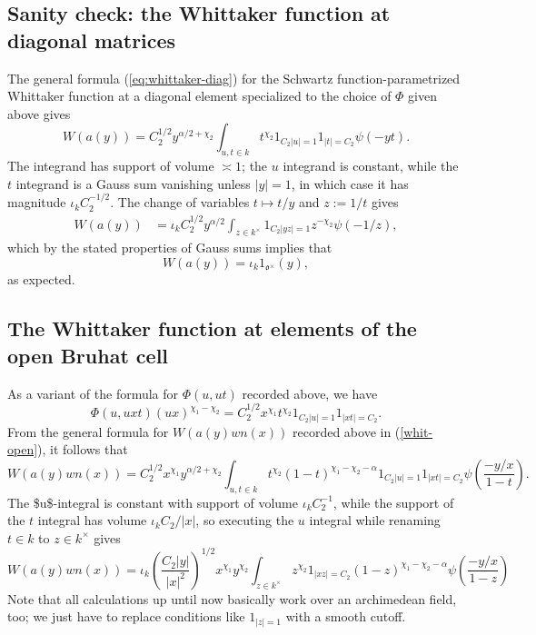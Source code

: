 \documentclass[reqno]{amsart} 
\begin{document}
\subsection{Sanity check: the Whittaker function at diagonal matrices}
\label{sec:org12b4732}
The general formula (\ref{eq:whittaker-diag}) for the Schwartz function-parametrized Whittaker function at a diagonal element specialized to the choice of \(\Phi\) given above gives
\begin{equation*}
  W(a(y)) = C_2^{1/2} y^{\alpha/2+\chi_2} \int_{u,t \in k} t^{\chi_2} 1_{C_2 |u| = 1} 1_{|t| = C_2} \psi(-y t).
\end{equation*}
The integrand has support of volume \(\asymp 1\); the \(u\) integrand is constant, while the \(t\) integrand is a Gauss sum vanishing unless \(|y| = 1\), in which case it has magnitude \(\iota_k C_2^{-1/2}\).  The change of variables \(t \mapsto t/y\) and \(z := 1/t\) gives
\begin{align*}
  W(a(y))
  &=
    \iota_k
    C_2^{1/2}
    y^{\alpha/2}
    \int_{z \in k^\times}
    1_{C_2 |y z| = 1}
    z^{-\chi_2} \psi(-1/z),
\end{align*}
which by the stated properties of Gauss sums implies that
\begin{equation*}
  W(a(y)) = \iota_{k} 1_{\mathfrak{o}^\times}(y),
\end{equation*}
as expected.

\subsection{The Whittaker function at elements of the open Bruhat cell}
\label{sec:org665ed72}
As a variant of the formula for \(\Phi(u,u t)\) recorded above, we have
\begin{equation*}
  \Phi(u, u x t) (u x)^{\chi_1 - \chi_2} = C_2^{1/2} x^{\chi_1} t^{\chi_2} 1_{C_2 |u| = 1} 1_{|x t| = C_2}.
\end{equation*}
From the general formula for \(W(a(y) w n(x))\) recorded above in (\ref{whit-open}), it follows that
\begin{equation*}
  W(a(y) w n(x)) = C_2^{1/2} x^{\chi_1} y^{\alpha/2 + \chi_2} \int_{u,t \in k} t^{\chi_2} (1 - t)^{\chi_1 - \chi_2 - \alpha} 1_{C_2 |u| = 1} 1_{|x t| = C_2} \psi \left( \frac{-y/x}{1-t} \right).
\end{equation*}
The \$u\$-integral is constant with support of volume \(\iota_k C_2^{-1}\), while the support of the \(t\) integral has volume \(\iota_k C_2 / |x|\), so executing the \(u\) integral while renaming \(t \in k\) to \(z \in k^\times\) gives
\begin{equation*}
  W(a(y) w n(x)) = \iota_k \left( \frac{C_2 |y|}{|x|^2} \right)^{1/2} x^{\chi_1} y^{\chi_2} \int_{z \in k^\times} z^{\chi_2} 1_{|x z| = C_2} (1 - z)^{\chi_1 - \chi_2 - \alpha} \psi \left( \frac{-y/x}{1-z} \right)
\end{equation*}
Note that all calculations up until now basically work over an archimedean field, too; we just have to replace conditions like \(1_{|z| = 1}\) with a smooth cutoff.
\end{document}
